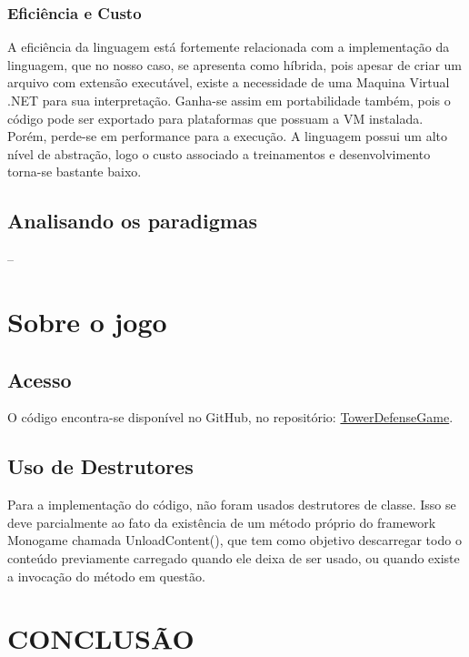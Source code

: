 \documentclass[rel_mlp]{iiufrgs}
\begin{document}
\subsection{Eficiência e Custo}

A eficiência da linguagem está fortemente relacionada com a implementação da linguagem, que no nosso caso, se apresenta como híbrida, pois apesar de criar um arquivo com extensão executável, existe a necessidade de uma Maquina Virtual .NET para sua interpretação. Ganha-se assim em portabilidade também, pois o código pode ser exportado para plataformas que possuam a VM instalada. Porém, perde-se em performance para a execução. A linguagem possui um alto nível de abstração, logo o custo associado a treinamentos e desenvolvimento torna-se bastante baixo.

\section{Analisando os paradigmas}

--

%
\chapter{Sobre o jogo}

\section{Acesso}

O código encontra-se disponível no GitHub, no repositório: \href{https://github.com/TMinuzzo/TowerDefenseGame/}{TowerDefenseGame}.

\section{Uso de Destrutores}

Para a implementação do código, não foram usados destrutores de classe. Isso se deve parcialmente ao fato da existência de um método próprio do framework Monogame chamada UnloadContent(), que tem como objetivo descarregar todo o conteúdo previamente carregado quando ele deixa de ser usado, ou quando existe a invocação do método em questão. 

%
\chapter{CONCLUSÃO}
\end{document}
